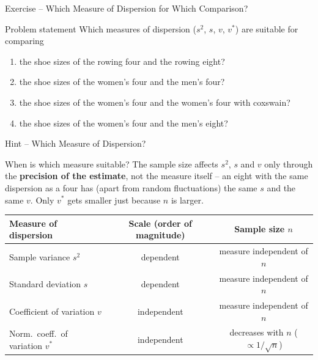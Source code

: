\documentclass[aspectratio=169,11pt]{beamer}
\begin{document}
\begin{frame}{Exercise -- Which Measure of Dispersion for Which Comparison?}
  \begin{block}{Problem statement}
    Which measures of dispersion ($s^2$, $s$, $v$, $v^*$) are suitable for comparing
    \begin{enumerate}
      \item the shoe sizes of the rowing four and the rowing eight?
      \item the shoe sizes of the women's four and the men's four?
      \item the shoe sizes of the women's four and the women's four with coxswain?
      \item the shoe sizes of the women's four and the men's eight?
    \end{enumerate}
  \end{block}
\end{frame}

\begin{frame}{Hint -- Which Measure of Dispersion?}
  \begin{block}{When is which measure suitable?}
    The sample size affects $s^2$, $s$ and $v$ only through the \textbf{precision of the estimate},
    not the measure itself -- an eight with the same dispersion as a four has (apart from random
    fluctuations) the same $s$ and the same $v$. Only $v^*$ gets smaller just because $n$ is larger.
  \end{block}

  \vspace{0.2cm}

  \begin{center}
    \renewcommand{\arraystretch}{1.3}
    \begin{tabular}{lcc}
      \toprule
      \textbf{Measure of dispersion} & \textbf{Scale (order of magnitude)} & \textbf{Sample size $n$} \\
      \midrule
      Sample variance $s^2$              & dependent   & measure independent of $n$ \\
      Standard deviation $s$             & dependent   & measure independent of $n$ \\
      Coefficient of variation $v$       & independent & measure independent of $n$ \\
      Norm.\ coeff.\ of variation $v^*$  & independent & decreases with $n$ ($\propto 1/\sqrt{n}$) \\
      \bottomrule
    \end{tabular}
  \end{center}
\end{frame}
\end{document}

